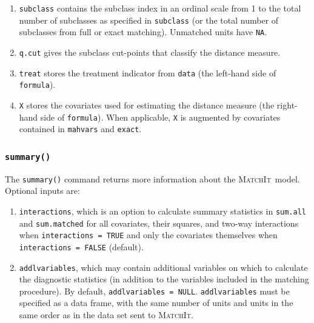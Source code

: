 \documentclass[oneside,letterpaper,titlepage]{article}
\newcommand{\MatchIt}{\textsc{MatchIt}}
\begin{document}
\begin{enumerate}
\item \texttt{subclass} contains the subclass index in an ordinal
  scale from 1 to the total number of subclasses as specified in
  \texttt{subclass} (or the total number of subclasses from full or
  exact matching).  Unmatched units have \texttt{NA}.
  
\item \texttt{q.cut} gives the subclass cut-points that classify the
  distance measure.
  
\item \texttt{treat} stores the treatment indicator from \texttt{data}
  (the left-hand side of \texttt{formula}).
 
\item \texttt{X} stores the covariates used for estimating the
  distance measure (the right-hand side of \texttt{formula}).  When
  applicable, \texttt{X} is augmented by covariates contained in
  \texttt{mahvars} and \texttt{exact}. 
\end{enumerate}


\subsubsection{{\tt summary()}}
The \texttt{summary()} command returns more information about the
\MatchIt\ model.  Optional inputs are:

\begin{enumerate}
\item \texttt{interactions}, which is an option to calculate summary
  statistics in \texttt{sum.all} and \texttt{sum.matched} for all
  covariates, their squares, and two-way interactions when
  \texttt{interactions = TRUE} and only the covariates themselves when
  \texttt{interactions = FALSE} (default).
\item \texttt{addlvariables}, which may contain additional variables
  on which to calculate the diagnostic statistics (in addition to the
  variables included in the matching procedure).  By default,
  \texttt{addlvariables = NULL}.  \texttt{addlvariables} must be
  specified as a data frame, with the same number of units and units
  in the same order as in the data set sent to \MatchIt .
\end{enumerate}
\end{document}
